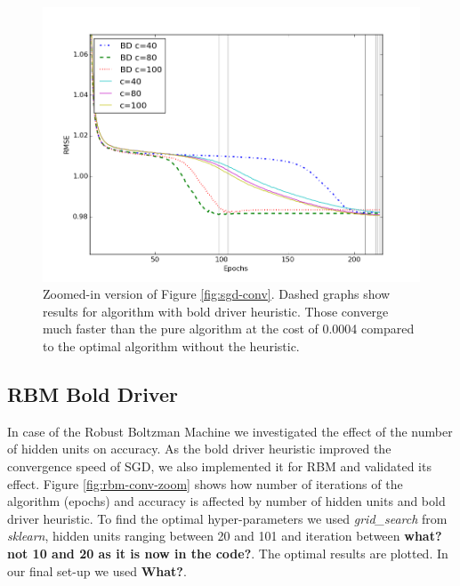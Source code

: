 \documentclass[10pt,conference,compsocconf]{IEEEtran}
\begin{document}
\begin{figure}[htbp]
  \centering
  \includegraphics[width=\columnwidth]{convergence_zoom_all.png}
  \caption{Zoomed-in version of Figure \ref{fig:sgd-conv}. Dashed graphs show results for algorithm with bold driver heuristic. Those converge much faster than the pure algorithm at the cost of 0.0004 compared to the optimal algorithm without the heuristic.}
  \label{fig:sgd-conv-zoom}
\end{figure} 
 
\subsection{RBM Bold Driver}
In case of the Robust Boltzman Machine we investigated the effect of the number of hidden units on accuracy. As the bold driver heuristic improved the convergence speed of SGD, we also implemented it for RBM and validated its effect. Figure \ref{fig:rbm-conv-zoom} shows how number of iterations of the algorithm (epochs) and accuracy is affected by number of hidden units and bold driver heuristic. To find the optimal hyper-parameters we used \textit{grid_search} from \textit{sklearn}, hidden units ranging between 20 and 101 and iteration between \textbf{what? not 10 and 20 as it is now in the code?}. The optimal results are plotted. In our final set-up we used \textbf{What?}.
\end{document}
